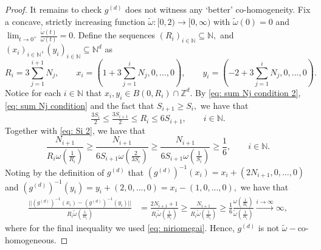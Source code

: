 \documentclass[10pt,a4paper]{amsart}
\newcommand{\N}{\mathbb{N}}
\newcommand{\Z}{\mathbb{Z}}
\begin{document}
\begin{proof}
    It remains to check $g^{(d)}$ does not witness any `better' co-homogeneity. Fix a concave, strictly increasing function $\widetilde{\omega}:[0,2) \to [0,\infty)$ with $\widetilde{\omega}(0) = 0$ and $\lim_{t \to 0^+} \frac{\widetilde{\omega}(t)}{\omega(t)} = 0$. 
    Define the sequences $(R_i)_{i \in \N}\subseteq \N,$ and $(x_i)_{i \in \N},(y_i)_{i \in \N} \subseteq \N^d$ as
    $$R_i = 3\sum_{j=1}^{i+1}N_j, \qquad x_i = \left(1+3\sum_{j=1}^{i}N_j,0,...,0\right),\qquad y_i =\left(-2+3\sum_{j=1}^{i}N_j,0,...,0\right) .$$
  Notice for each $i \in \N$ that $x_i,y_i \in B(0,R_i) \cap \Z^d.$ 
  By \eqref{eq: sum Nj condition 2}, \eqref{eq: sum Nj condition} and the fact that $S_{i+1} \geq S_i,$ we have that $$\tfrac{3S_{i}}{2} \leq \tfrac{3S_{i+1}}{2} \leq R_i \leq 6S_{i+1}, \qquad i \in \N.$$ Together with \eqref{eq: Si 2}, we have that
  \begin{equation} \label{eq: niriomegai}
\frac{N_{i+1}}{R_i\omega\left(\frac{1}{R_i}\right)} \geq \frac{N_{i+1}}{6S_{i+1}\omega\left(\frac{2}{3S_{i}}\right)}\geq \frac{N_{i+1}}{6S_{i+1}\omega\left(\frac{1}{S_{i}}\right)}\geq \frac{1}{6}, \qquad i \in \N. \end{equation}
 Noting by the definition of $g^{(d)}$ that $(g^{(d)})^{-1}(x_i) = x_i+(2N_{i+1},0,...,0)$ and $(g^{(d)})^{-1}(y_i) = y_i + (2,0,...,0) = x_i-(1,0,...,0),$ we have that
  \begin{equation*}
      \begin{split}
          \frac{||(g^{(d)})^{-1}(x_i) - (g^{(d)})^{-1}(y_i)||}{R_i \widetilde{\omega}\left(\frac{1}{R_i}\right)}  &= \frac{2N_{i+1}+1}{R_i \widetilde{\omega}\left(\frac{1}{R_i}\right)} \geq \frac{N_{i+1}}{R_i \widetilde{\omega}\left(\frac{1}{R_i}\right)}
          \geq \frac{1}{6}\frac{{\omega}\left(\frac{1}{R_i}\right)}{\widetilde{\omega}\left(\frac{1}{R_i}\right)}\xrightarrow{i \to \infty}\infty,
      \end{split}
  \end{equation*} where for the final inequality we used \eqref{eq: niriomegai}. Hence, $g^{(d)}$ is not $\widetilde{\omega}-$co-homogeneous.
\end{proof}
\end{document}
